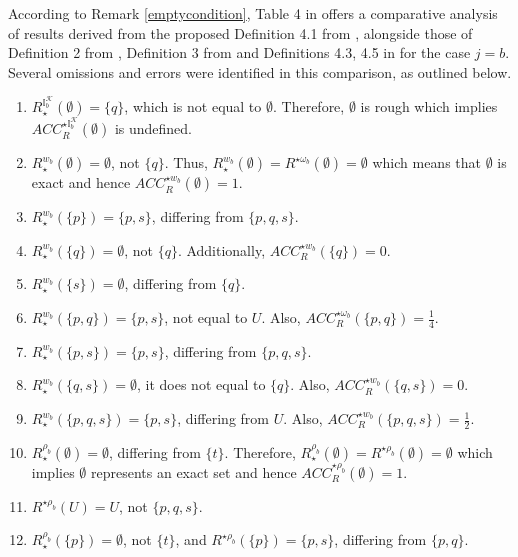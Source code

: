 \documentclass{article}
\theoremstyle{theorem}
\theoremstyle{definition}
\theoremstyle{remark}
\begin{document}
According to Remark \ref{emptycondition}, Table 4 in \cite{Al-shami 2024} offers a comparative analysis of results derived from the proposed Definition 4.1 from \cite{Al-shami 2024}, alongside those of Definition 2 from \cite{Yao 1998}, Definition 3 from \cite{Allam2005}  and Definitions 4.3, 4.5 in \cite{Atef 2020} for the case $j = b$. Several omissions and errors were identified in this comparison, as outlined below.
\begin{enumerate}
\item $R_{\star}^{\mathbb{I}_{b}^{\mathcal{K}}}(\emptyset)=\{q\}$, which is not equal to $\emptyset$. Therefore, $\emptyset$ is rough which implies $ACC_{R}^{\star\mathbb{I}_{b}^{\mathcal{K}}}(\emptyset)$ is undefined.
\item $R_{\star}^{w_{b}}(\emptyset)=\emptyset$, not $\{q\}$. Thus, $R_{\star}^{w_{b}}(\emptyset)= R^{\star\omega_b}(\emptyset)=\emptyset$ which means that $\emptyset$ is exact and hence $ACC_{R}^{\star w_{b}}(\emptyset) = 1$.
\item $R_{\star}^{w_{b}}(\{p\})=\{p, s\}$, differing from $\{p, q, s\}$.
\item $R_{\star}^{w_{b}}(\{q\})=\emptyset$, not $\{q\}$. Additionally, $ACC_{R}^{\star w_{b}}(\{q\})= 0$.
\item $R_{\star}^{w_{b}}(\{s\})=\emptyset$, differing from $\{q\}$.
\item $R_{\star}^{w_{b}}(\{p, q\})=\{p, s\}$, not equal to $U$. Also, $ACC_{R}^{\star\omega_{b}}(\{p, q\})=\frac{1}{4}$.
\item $R_{\star}^{w_{b}}(\{p, s\})=\{p, s\}$, differing from $\{p, q, s\}$.
\item $R_{\star}^{w_{b}}(\{q, s\})=\emptyset$, it does not equal to $\{q\}$.
Also, $ACC_{R}^{\star w_{b}}(\{q, s\})= 0$.
 \item $R_{\star}^{w_{b}}(\{p, q, s\})=\{p, s\}$, differing from $U$. Also, $ACC_{R}^{\star w_{b}}(\{p, q, s\})= \frac{1}{2}$.
 \item $R_{\star}^{\rho_{b}}(\emptyset)=\emptyset$, differing from $\{t\}$. Therefore, $R_{\star}^{\rho_{b}}(\emptyset) = R^{\star \rho_{b}}(\emptyset) = \emptyset$ which implies $\emptyset$ represents an exact set and hence $ACC_{R}^{\star \rho_{b}}(\emptyset) = 1$.
 \item $R^{\star \rho_{b}}(U)=U$, not $\{p, q, s\}$.
 \item  $R_{\star}^{\rho_{b}}(\{p\})=\emptyset$, not $\{t\}$, and $R^{\star \rho_{b}}(\{p\})=\{p, s\}$, differing from $\{p, q\}$.

\end{enumerate}
\end{document}
